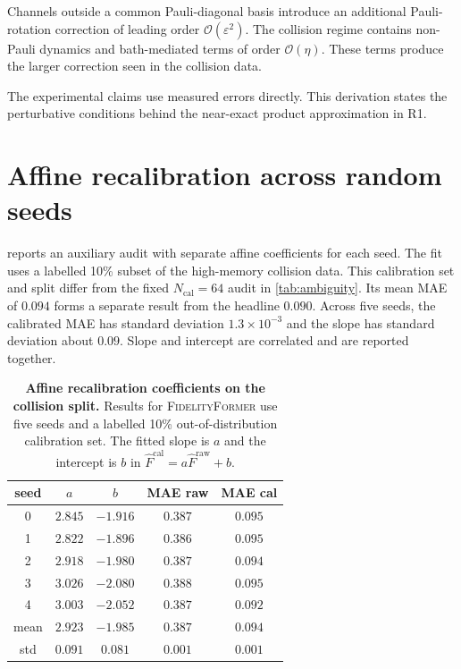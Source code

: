 \documentclass[12pt]{iopart}
\providecommand{\bm}[1]{\boldsymbol{#1}}
\newcommand{\Fhat}{\widehat{F}}
\newcommand{\eps}{\varepsilon}
\newcommand{\fidno}{\textsc{FidelityFormer}}
\begin{document}
Channels outside a common Pauli-diagonal basis introduce an additional Pauli-rotation correction of leading order $\mathcal{O}(\eps^{2})$. The collision regime contains non-Pauli dynamics and bath-mediated terms of order $\mathcal{O}(\eta)$. These terms produce the larger correction seen in the collision data.

The experimental claims use measured errors directly. This derivation states the perturbative conditions behind the near-exact product approximation in R1.


\section{Affine recalibration across random seeds}
\label{app:recalibration}

 reports an auxiliary audit with separate affine coefficients for each seed. The fit uses a labelled 10\% subset of the high-memory collision data. This calibration set and split differ from the fixed $N_{\mathrm{cal}}=64$ audit in \cref{tab:ambiguity}. Its mean MAE of $0.094$ forms a separate result from the headline $0.090$. Across five seeds, the calibrated MAE has standard deviation $1.3\times10^{-3}$ and the slope has standard deviation about $0.09$. Slope and intercept are correlated and are reported together.

\begin{table}[h]
\centering
\caption{\textbf{Affine recalibration coefficients on the collision split.} Results for \fidno{} use five seeds and a labelled 10\% out-of-distribution calibration set. The fitted slope is $a$ and the intercept is $b$ in $\Fhat^{\mathrm{cal}} = a \Fhat^{\mathrm{raw}} + b$.}
\label{tab:recal_seeds}
\begin{tabular}{ccccc}
\toprule
seed & $a$ & $b$ & MAE raw & MAE cal \\
\midrule
0 & $2.845$ & $-1.916$ & $0.387$ & $0.095$ \\
1 & $2.822$ & $-1.896$ & $0.386$ & $0.095$ \\
2 & $2.918$ & $-1.980$ & $0.387$ & $0.094$ \\
3 & $3.026$ & $-2.080$ & $0.388$ & $0.095$ \\
4 & $3.003$ & $-2.052$ & $0.387$ & $0.092$ \\
\midrule
mean   & $2.923$ & $-1.985$ & $0.387$ & $0.094$ \\
std    & $0.091$ & $0.081$ & $0.001$ & $\bm{0.001}$ \\
\bottomrule
\end{tabular}
\end{table}
\end{document}
